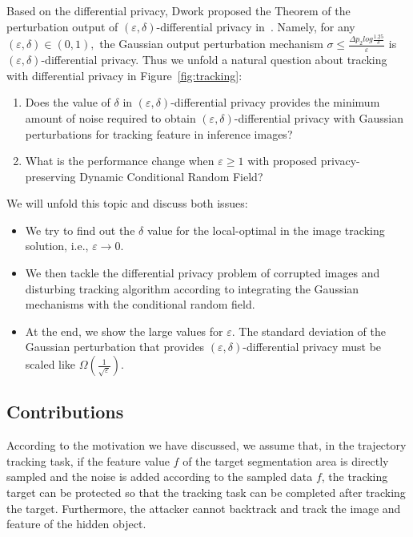 \documentclass[trans]{IEEEtran}
\newcommand{\el}[1]{{\color{black}#1}}
\begin{document}
Based on the differential privacy, Dwork proposed the Theorem of the perturbation output of $(\varepsilon,\delta)$-differential privacy in~\cite{dwork2009complexity}. Namely, for any $(\varepsilon,\delta)\in (0,1),$ the Gaussian output perturbation mechanism $\sigma \leq \frac{\Delta p_2 log\frac{1.25}{\delta}}{\varepsilon}$  is $(\varepsilon,\delta)$-differential privacy.  \el{Thus we} unfold a natural question about tracking with differential privacy in Figure~\ref{fig:tracking}: 

\begin{enumerate}
    \item Does the value of $\delta$ in $(\varepsilon,\delta)$-differential privacy provides the minimum amount of noise required to obtain $(\varepsilon,\delta)$-differential privacy with Gaussian perturbations for tracking feature in inference images?
    \item What is the performance change when $\varepsilon \geq 1$ with proposed privacy-preserving Dynamic Conditional Random Field?  
\end{enumerate}

We will unfold this topic and discuss both issues: 
\begin{itemize}
\item We try to find out the $\delta$ value for the local-optimal in the image tracking solution, i.e.,  $\varepsilon \rightarrow 0$.
\item We then tackle the differential privacy problem of corrupted images and disturbing tracking algorithm according to integrating the Gaussian mechanisms with the conditional random field. 
\item At the end, we show the large values for $\varepsilon$. The standard deviation of the Gaussian perturbation that provides $(\varepsilon,\delta)$-differential privacy must be scaled like $\Omega(\frac{1}{\sqrt{\varepsilon}})$. 
    
\end{itemize}


\subsection{Contributions}
According to the motivation we \el{have discussed, we assume that, in the trajectory tracking task, if the feature value $f$ of the target segmentation area is directly sampled and the noise is added according to the sampled data $f$,} the tracking target can be protected so that the tracking task can be completed after tracking the target. Furthermore, the attacker cannot backtrack and track the image and feature of the hidden object.
\end{document}
